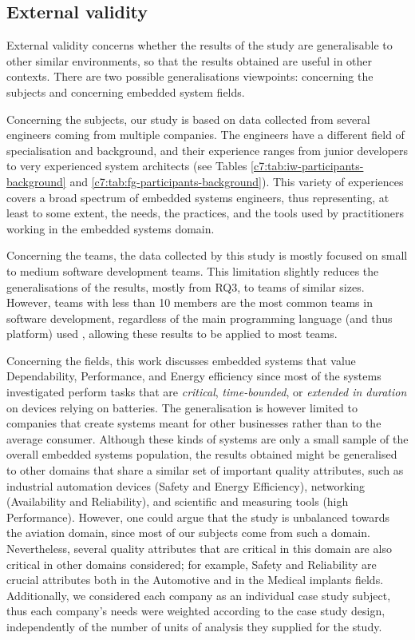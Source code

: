 \subsection{External validity}
External validity concerns whether the results of the study are generalisable to other similar environments, so that the results obtained are useful in other contexts.
There are two possible generalisations viewpoints: concerning the subjects and concerning embedded system fields.

Concerning the subjects, our study is based on data collected from several engineers coming from multiple companies. 
The engineers have a different field of specialisation and background, and their experience ranges from junior developers to very experienced system architects (see Tables \ref{c7:tab:iw-participants-background} and \ref{c7:tab:fg-participants-background}).
This variety of experiences covers a broad spectrum of embedded systems engineers, thus representing, at least to some extent,  the needs, the practices, and the tools used by practitioners working in the embedded systems domain.

Concerning the teams, the data collected by this study is mostly focused on small to medium software development teams.
This limitation slightly reduces the generalisations of the results, mostly from RQ3, to teams of similar sizes.
However, teams with less than 10 members are the most common teams in software development, regardless of the main programming language (and thus platform) used \cite{Rodriguez2012}, allowing these results to be applied to most teams.

Concerning the fields, this work discusses embedded systems that value Dependability, Performance, and Energy efficiency since most of the systems investigated perform tasks that are \textit{critical}, \textit{time-bounded}, or \textit{extended in duration} on devices relying on batteries.
The generalisation is however limited to companies that create systems meant for other businesses rather than to the average consumer.
Although these kinds of systems are only a small sample of the overall embedded systems population, the results obtained might be generalised to other domains that share a similar set of important quality attributes, such as industrial automation devices (Safety and Energy Efficiency), networking (Availability and Reliability), and scientific and measuring tools (high Performance).
However, one could argue that the study is unbalanced towards the aviation domain, since most of our subjects come from such a domain.
Nevertheless, several quality attributes that are critical in this domain are also critical in other domains considered; for example, Safety and Reliability are crucial attributes both in the Automotive and in the Medical implants fields.
Additionally, we considered each company as an individual case study subject, thus each company's needs were weighted according to the case study design, independently of the number of units of analysis they supplied for the study.

